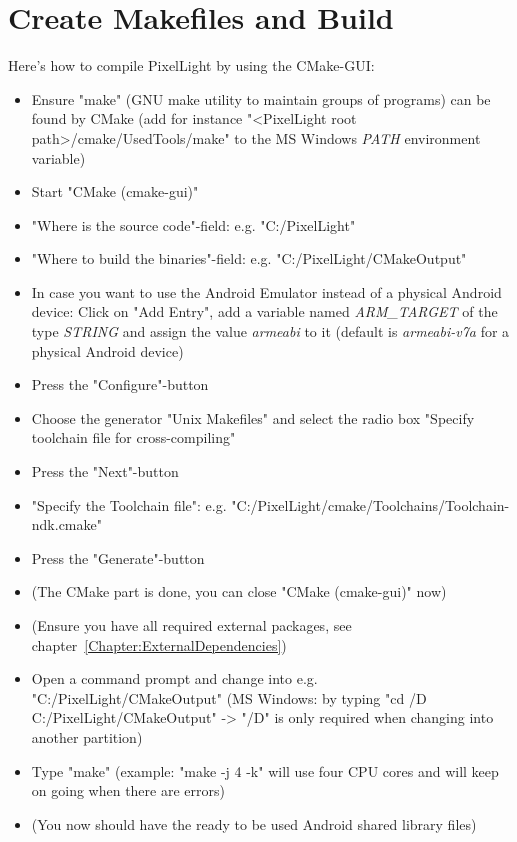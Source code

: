 \section{Create Makefiles and Build}
\label{Android:CreateMakefilesAndBuild}
Here's how to compile PixelLight by using the CMake-\ac{GUI}:
\begin{itemize}
\item{Ensure "make" (GNU make utility to maintain groups of programs) can be found by CMake (add for instance "\textless PixelLight root path\textgreater /cmake/UsedTools/make" to the \ac{MS} Windows \emph{PATH} environment variable)}
\item{Start "CMake (cmake-gui)"}
\item{"Where is the source code"-field: e.g. "C:/PixelLight"}
\item{"Where to build the binaries"-field: e.g. "C:/PixelLight/CMakeOutput"}
\item{In case you want to use the Android Emulator instead of a physical Android device: Click on "Add Entry", add a variable named \emph{ARM\_TARGET} of the type \emph{STRING} and assign the value \emph{armeabi} to it (default is \emph{armeabi-v7a} for a physical Android device)}
\item{Press the "Configure"-button}
\item{Choose the generator "Unix Makefiles" and select the radio box "Specify toolchain file for cross-compiling"}
\item{Press the "Next"-button}
\item{"Specify the Toolchain file": e.g. "C:/PixelLight/cmake/Toolchains/Toolchain-ndk.cmake"}
\item{Press the "Generate"-button}
\item{(The CMake part is done, you can close "CMake (cmake-gui)" now)}
\item{(Ensure you have all required external packages, see chapter~\ref{Chapter:ExternalDependencies})}
\item{Open a command prompt and change into e.g. "C:/PixelLight/CMakeOutput" (\ac{MS} Windows: by typing "cd /D C:/PixelLight/CMakeOutput" -> "/D" is only required when changing into another partition)}
\item{Type "make" (example: "make -j 4 -k" will use four \ac{CPU} cores and will keep on going when there are errors)}
\item{(You now should have the ready to be used Android shared library files)}
\end{itemize}




